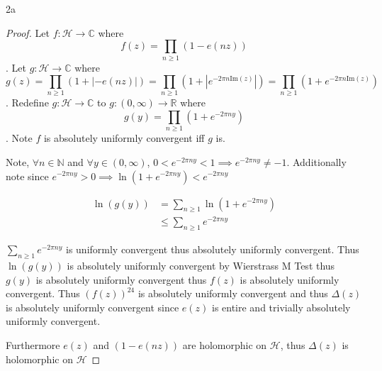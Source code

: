 \documentclass{article}
\newcommand*{\HC}{\mathcal{H}}
\newcommand{\C}{\mathbb{C}}
\newcommand{\R}{\mathbb{R}}
\newcommand{\N}{\mathbb{N}}
\newcommand{\abs}[1]{\left\lvert #1\right\rvert}
\newcommand{\IM}[1]{\text{Im}(#1)}
\begin{document}
\bigskip

\begin{PROB}{2a}\label{Problem 2a.}
\end{PROB}
\begin{proof}
    Let $f: \HC \to \C$ where \[f(z) = \prod_{n \geq 1}(1 - e(nz))\]. Let $g: \HC \to \C$ where \[g(z) = \prod_{n \geq 1}(1 + \abs{-e(nz)}) = \prod_{n \geq 1}(1 + \abs{e^{-2 \pi n \IM{z}}}) = \prod_{n \geq 1}(1 + e^{-2 \pi n \IM{z}})\]. Redefine $g: \HC \to \C$ to $g: (0, \infty) \to \R$ where \[g(y) = \prod_{n \geq 1}(1 + e^{-2 \pi n y})\]. Note $f$ is absolutely uniformly convergent iff $g$ is.     

    Note, $\forall n \in \N$ and $\forall y \in (0, \infty)$, $0 < e^{- 2 \pi n y} < 1 \implies e^{-2 \pi n y} \neq -1$. Additionally note since $e^{-2 \pi n y} > 0 \implies \ln(1 + e^{-2 \pi n y}) < e^{-2 \pi n y}$   
    
    \begin{align*}
        \ln(g(y)) &= \sum_{n \geq 1}\ln(1 + e^{-2 \pi n y})\\ 
        &\leq \sum_{n \geq 1}e^{-2 \pi n y}
    \end{align*}

    $ \sum_{n \geq 1}e^{-2 \pi n y}$ is uniformly convergent thus absolutely uniformly convergent. Thus $\ln(g(y))$ is absolutely uniformly convergent by Wierstrass M Test thus $g(y)$ is absolutely uniformly convergent thus $f(z)$ is absolutely uniformly convergent. Thus $(f(z))^{24}$ is absolutely uniformly convergent and thus $\Delta(z)$ is absolutely uniformly convergent since $e(z)$ is entire and trivially absolutely uniformly convergent.
    
    Furthermore $e(z)$ and $(1 - e(nz))$ are holomorphic on $\HC$, thus $\Delta(z)$ is holomorphic on $\HC$     
\end{proof}
\end{document}
